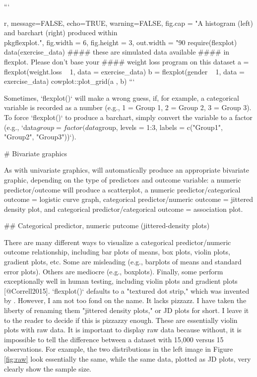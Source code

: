 ```{r, message=FALSE, echo=TRUE, warning=FALSE, fig.cap = "A histogram (left) and barchart (right) produced within \\pkg{flexplot}.", fig.width = 6, fig.height = 3, out.width = "90%
require(flexplot)
data(exercise_data) #### these are simulated data available 
                    #### in flexplot. Please don't base your 
                    #### weight loss program on this dataset
a = flexplot(weight.loss ~ 1, data = exercise_data)
b = flexplot(gender ~ 1, data = exercise_data)
cowplot::plot_grid(a , b)
```


Sometimes, `flexplot()` will make a wrong guess, if, for example, a categorical variable is recorded as a number (e.g., 1 = Group 1, 2 =  Group 2, 3  =  Group 3). To force `flexplot()` to produce a barchart, simply convert the variable to a factor (e.g., `data$group = factor(data$group, levels = 1:3, labels = c("Group1", "Group2", "Group3"))`). 

# Bivariate graphics

As with univariate graphics,  will automatically produce an appropriate bivariate graphic, depending on the type of predictors and outcome variable: a numeric predictor/outcome will produce a scatterplot, a numeric predictor/categorical outcome = logistic curve graph, categorical predictor/numeric outcome = jittered density plot, and categorical predictor/categorical outcome = association plot. 

## Categorical predictor, numeric putcome (jittered-density plots)

There are many different ways to visualize a categorical predictor/numeric outcome relationship, including bar plots of means, box plots, violin plots, gradient plots, etc. Some are misleading (e.g., barplots of means and standard error plots). Others are mediocre (e.g., boxplots). Finally, some perform exceptionally well in human testing, including violin plots and gradient plots [@Correll2015]. `flexplot()` defaults to a "textured dot strip," which was invented by \cite{Tukey1990} \citep[see also][]{Wilkinson1999}. However, I am not too fond on the name. It lacks pizzazz. I have taken the liberty of renaming them "jittered density plots," or JD plots for short. I leave it to the reader to decide if this is pizzazzy enough. These are essentially violin plots with raw data. It is important to display raw data because without, it is impossible to tell the difference between a dataset with 15,000 versus 15 observations. For example, the two distributions in the left image in Figure \ref{fig:raw} look essentially the same, while the same data, plotted as JD plots, very clearly show the sample size. 

}
